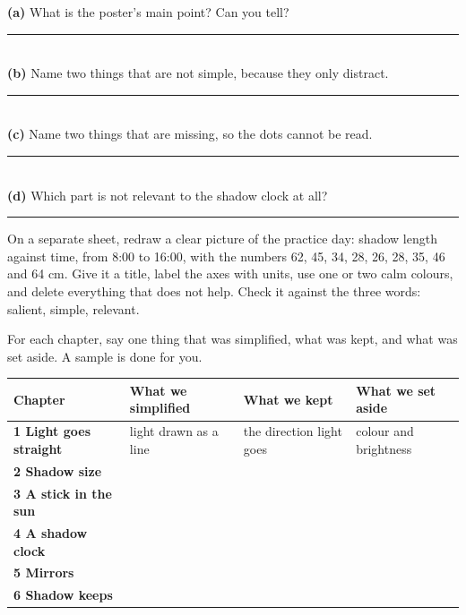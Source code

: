 \begin{slopbox}
\textbf{(a)} What is the poster's main point? Can you tell?\\[3pt]\rule{\linewidth}{0.5pt}\\[6pt]
\textbf{(b)} Name two things that are not simple, because they only distract.\\[3pt]\rule{\linewidth}{0.5pt}\\[6pt]
\textbf{(c)} Name two things that are missing, so the dots cannot be read.\\[3pt]\rule{\linewidth}{0.5pt}\\[6pt]
\textbf{(d)} Which part is not relevant to the shadow clock at all?\\[3pt]\rule{\linewidth}{0.5pt}
\end{slopbox}

\clearpage
\thispagestyle{fancy}
On a separate sheet, redraw a clear picture of the practice day: shadow length against time, from 8:00 to 16:00, with the numbers 62, 45, 34, 28, 26, 28, 35, 46 and 64 cm. Give it a title, label the axes with units, use one or two calm colours, and delete everything that does not help. Check it against the three words: salient, simple, relevant.

\begin{center}
\end{center}

\clearpage
\thispagestyle{fancy}
For each chapter, say one thing that was simplified, what was kept, and what was set aside. A sample is done for you.

\renewcommand{\arraystretch}{2.3}
\begin{center}\sffamily\scriptsize
\begin{tabularx}{\textwidth}{|>{\bfseries}p{2.1cm}|X|X|X|}
\hline
\textbf{Chapter} & \textbf{What we simplified} & \textbf{What we kept} & \textbf{What we set aside} \\ \hline
1 Light goes straight & light drawn as a line & the direction light goes & colour and brightness \\ \hline
2 Shadow size & & & \\ \hline
3 A stick in the sun & & & \\ \hline
4 A shadow clock & & & \\ \hline
5 Mirrors & & & \\ \hline
6 Shadow keeps & & & \\ \hline
\end{tabularx}
\end{center}

